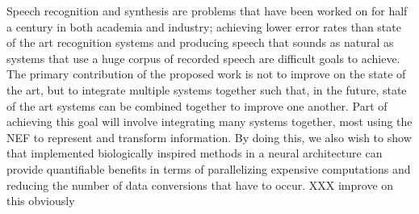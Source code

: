 \documentclass{article}
\begin{document}
Speech recognition and synthesis
are problems that have been worked
on for half a century in both academia and industry;
achieving lower error rates
than state of the art recognition systems
and producing speech that sounds as natural
as systems that use a huge corpus
of recorded speech are
difficult goals to achieve.
The primary contribution of the proposed work
is not to improve on the state of the art,
but to integrate multiple systems together
such that, in the future,
state of the art systems
can be combined together
to improve one another.
Part of achieving this goal will involve
integrating many systems together,
most using the NEF to represent
and transform information.
By doing this, we also wish to show
that implemented biologically inspired methods
in a neural architecture
can provide quantifiable benefits
in terms of parallelizing expensive computations
and reducing the number of data conversions
that have to occur.
XXX improve on this obviously



\end{document}
